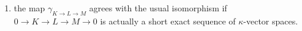 \begin{lemma}
\begin{enumerate}
$$\begin{array}{cccc}
\underset{\epsilon}{\downarrow}\underset{\gamma_{A \to B \to C} \otimes \gamma_{G \to H \to I}}{\longrightarrow} &  &  & \det\nolimits_\kappa(B) \otimes
\det\nolimits_\kappa(H)
\overset{\gamma_{B \to E \to H}}{\downarrow} \\  &  &  & \det\nolimits_\kappa(E) \\ \det\nolimits_\kappa(A) \otimes
\det\nolimits_\kappa(G) \otimes
\det\nolimits_\kappa(C) \otimes
\det\nolimits_\kappa(I)
\overset{\gamma_{A \to D \to G} \otimes \gamma_{C \to F \to I}}{\longrightarrow} &  &  & \det\nolimits_\kappa(D) \otimes
\det\nolimits_\kappa(F)
\underset{\gamma_{D \to E \to F}}{\uparrow}\end{array}
$$
where $\epsilon$ is the switch of the factors in the tensor product
times $(-1)^{cg}$ with $c = \text{length}_R(C)$ and $g = \text{length}_R(G)$,
and
\item the map $\gamma_{K \to L \to M}$ agrees with the usual isomorphism
if $0 \to K \to L \to M \to 0$ is actually a short exact sequence
of $\kappa$-vector spaces.
\end{enumerate}
\end{lemma}

